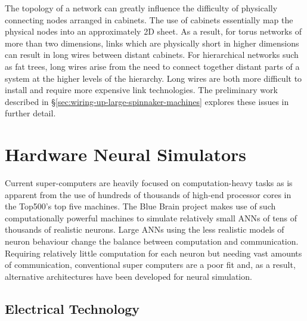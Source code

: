 			The topology of a network can greatly influence the difficulty of
			physically connecting nodes arranged in cabinets. The use of cabinets
			essentially map the physical nodes into an approximately 2D sheet. As a
			result, for torus networks of more than two dimensions, links which are
			physically short in higher dimensions can result in long wires between
			distant cabinets. For hierarchical networks such as fat trees, long wires
			arise from the need to connect together distant parts of a system at the
			higher levels of the hierarchy. Long wires are both more difficult to
			install and require more expensive link technologies. The preliminary work
			described in \S\ref{sec:wiring-up-large-spinnaker-machines} explores these
			issues in further detail.
			
			
	
	\section{Hardware Neural Simulators}
		
		
		Current super-computers are heavily focused on computation-heavy tasks as is
		apparent from the use of hundreds of thousands of high-end processor cores
		in the Top500's top five machines. The Blue Brain project \cite{markram06}
		makes use of such computationally powerful machines to simulate relatively
		small ANNs of tens of thousands of realistic neurons. Large ANNs using the
		less realistic models of neuron behaviour change the balance between
		computation and communication.  Requiring relatively little computation for
		each neuron but needing vast amounts of communication, conventional super
		computers are a poor fit and, as a result, alternative architectures have
		been developed for neural simulation.
		
		\subsection{Electrical Technology}
		
